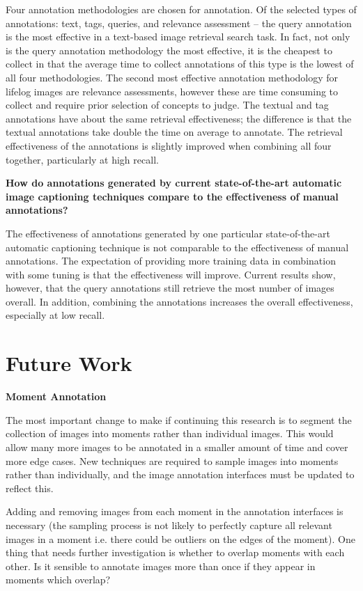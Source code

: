 Four annotation methodologies are chosen for annotation. Of the selected types of annotations: text, tags, queries, and relevance assessment -- the query annotation is the most effective in a text-based image retrieval search task. In fact, not only is the query annotation methodology the most effective, it is the cheapest to collect in that the average time to collect annotations of this type is the lowest of all four methodologies. The second most effective annotation methodology for lifelog images are relevance assessments, however these are time consuming to collect and require prior selection of concepts to judge. The textual and tag annotations have about the same retrieval effectiveness; the difference is that the textual annotations take double the time on average to annotate. The retrieval effectiveness of the annotations is slightly improved when combining all four together, particularly at high recall.

\textbf{How do annotations generated by current state-of-the-art automatic image captioning techniques compare to the effectiveness of manual annotations?}

The effectiveness of annotations generated by one particular state-of-the-art automatic captioning technique is not comparable to the effectiveness of manual annotations. The expectation of providing more training data in combination with some tuning is that the effectiveness will improve. Current results show, however, that the query annotations still retrieve the most number of images overall. In addition, combining the annotations increases the overall effectiveness, especially at low recall.

\section{Future Work}

\textbf{Moment Annotation}

The most important change to make if continuing this research is to segment the collection of images into moments rather than individual images. This would allow many more images to be annotated in a smaller amount of time and cover more edge cases. New techniques are required to sample images into moments rather than individually, and the image annotation interfaces must be updated to reflect this. 

Adding and removing images from each moment in the annotation interfaces is necessary (the sampling process is not likely to perfectly capture all relevant images in a moment i.e. there could be outliers on the edges of the moment). One thing that needs further investigation is whether to overlap moments with each other. Is it sensible to annotate images more than once if they appear in moments which overlap?

